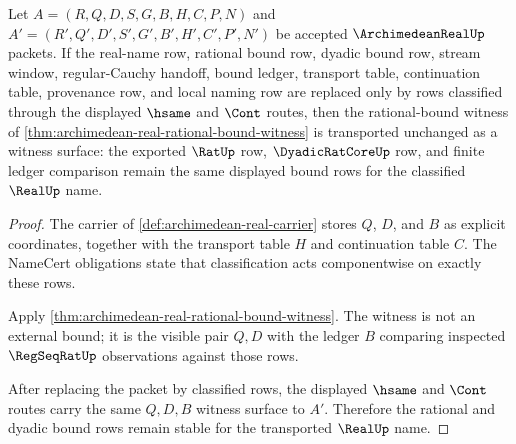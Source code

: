 \begin{theorem}
\label{thm:archimedean-real-transported-bound-stability}
Let $A=(R,Q,D,S,G,B,H,C,P,N)$ and $A'=(R',Q',D',S',G',B',H',C',P',N')$ be accepted $\ArchimedeanRealUp$ packets. If the real-name row, rational bound row, dyadic bound row, stream window, regular-Cauchy handoff, bound ledger, transport table, continuation table, provenance row, and local naming row are replaced only by rows classified through the displayed $\hsame$ and $\Cont$ routes, then the rational-bound witness of \autoref{thm:archimedean-real-rational-bound-witness} is transported unchanged as a witness surface: the exported $\RatUp$ row, $\DyadicRatCoreUp$ row, and finite ledger comparison remain the same displayed bound rows for the classified $\RealUp$ name.
\end{theorem}
\begin{proof}
The carrier of \autoref{def:archimedean-real-carrier} stores $Q$, $D$, and $B$ as explicit coordinates, together with the transport table $H$ and continuation table $C$. The NameCert obligations state that classification acts componentwise on exactly these rows.

Apply \autoref{thm:archimedean-real-rational-bound-witness}. The witness is not an external bound; it is the visible pair $Q,D$ with the ledger $B$ comparing inspected $\RegSeqRatUp$ observations against those rows.

After replacing the packet by classified rows, the displayed $\hsame$ and $\Cont$ routes carry the same $Q,D,B$ witness surface to $A'$. Therefore the rational and dyadic bound rows remain stable for the transported $\RealUp$ name.
\end{proof}

